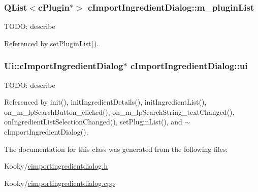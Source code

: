 \subsubsection[{\texorpdfstring{m\+\_\+plugin\+List}{m_pluginList}}]{\setlength{\rightskip}{0pt plus 5cm}Q\+List$<${\bf c\+Plugin}$\ast$$>$ c\+Import\+Ingredient\+Dialog\+::m\+\_\+plugin\+List\hspace{0.3cm}{\ttfamily [protected]}}\hypertarget{classc_import_ingredient_dialog_ad5795b238430db474ae852bfbb493578}{}\label{classc_import_ingredient_dialog_ad5795b238430db474ae852bfbb493578}
T\+O\+DO\+: describe 

Referenced by set\+Plugin\+List().

\subsubsection[{\texorpdfstring{ui}{ui}}]{\setlength{\rightskip}{0pt plus 5cm}Ui\+::c\+Import\+Ingredient\+Dialog$\ast$ c\+Import\+Ingredient\+Dialog\+::ui\hspace{0.3cm}{\ttfamily [private]}}\hypertarget{classc_import_ingredient_dialog_a80da8aa411eb8da3a692693445e64408}{}\label{classc_import_ingredient_dialog_a80da8aa411eb8da3a692693445e64408}
T\+O\+DO\+: describe 

Referenced by init(), init\+Ingredient\+Details(), init\+Ingredient\+List(), on\+\_\+m\+\_\+lp\+Search\+Button\+\_\+clicked(), on\+\_\+m\+\_\+lp\+Search\+String\+\_\+text\+Changed(), on\+Ingredient\+List\+Selection\+Changed(), set\+Plugin\+List(), and $\sim$c\+Import\+Ingredient\+Dialog().



The documentation for this class was generated from the following files\+:\begin{DoxyCompactItemize}
\item 
Kooky/\hyperlink{cimportingredientdialog_8h}{cimportingredientdialog.\+h}\item 
Kooky/\hyperlink{cimportingredientdialog_8cpp}{cimportingredientdialog.\+cpp}\end{DoxyCompactItemize}
